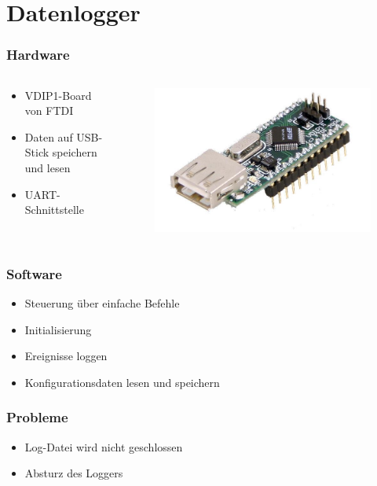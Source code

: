 \section{Datenlogger}

\begin{frame}
	\frametitle{Hardware}	
	\begin{columns}
		\begin{column}{0.6 \textwidth}
			\begin{itemize}
				\item VDIP1-Board von FTDI
				\item Daten auf USB-Stick speichern und lesen
				\item UART-Schnittstelle
			\end{itemize}
		\end{column}
		\begin{column}{0.4 \textwidth}
			\vspace{-2.8em}
			\begin{figure}[h]
				\centering
				\includegraphics[width = 0.8 \textwidth]{../images/vdip1.jpg}
			\end{figure}
		\end{column}
	\end{columns}
\end{frame}

\begin{frame}
	\frametitle{Software}	
	\begin{itemize}
		\item Steuerung über einfache Befehle
		\item Initialisierung
		\item Ereignisse loggen
		\item Konfigurationsdaten lesen und speichern
	\end{itemize}
\end{frame}

\begin{frame}	
	\frametitle{Probleme}
	\begin{itemize}
		\item Log-Datei wird nicht geschlossen
		\item Absturz des Loggers
	\end{itemize}
	
\end{frame}
